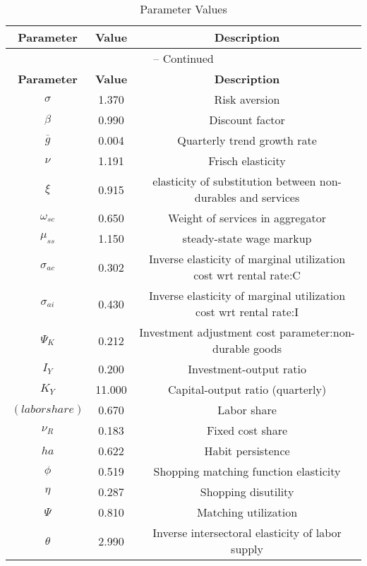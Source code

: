 \begin{center}
\begin{longtable}{ccc}
\caption{Parameter Values}\\%
\toprule%
\multicolumn{1}{c}{\textbf{Parameter}} &
\multicolumn{1}{c}{\textbf{Value}} &
 \multicolumn{1}{c}{\textbf{Description}}\\%
\midrule%
\endfirsthead
\multicolumn{3}{c}{{\tablename} \thetable{} -- Continued}\\%
\midrule%
\multicolumn{1}{c}{\textbf{Parameter}} &
\multicolumn{1}{c}{\textbf{Value}} &
  \multicolumn{1}{c}{\textbf{Description}}\\%
\midrule%
\endhead
${\sigma}$ 	 & 	 1.370 	 & 	 Risk aversion\\
${\beta}$ 	 & 	 0.990 	 & 	 Discount factor\\
${\overline{g}}$ 	 & 	 0.004 	 & 	 Quarterly trend growth rate\\
$\nu$ 	 & 	 1.191 	 & 	 Frisch elasticity\\
$\xi$ 	 & 	 0.915 	 & 	 elasticity of substitution between non-durables and services\\
$\omega_{sc}$ 	 & 	 0.650 	 & 	 Weight of services in aggregator\\
$\mu_{ss}$ 	 & 	 1.150 	 & 	 steady-state wage markup\\
${\sigma_{ac}}$ 	 & 	 0.302 	 & 	 Inverse elasticity of marginal utilization cost wrt rental rate:C\\
${\sigma_{ai}}$ 	 & 	 0.430 	 & 	 Inverse elasticity of marginal utilization cost wrt rental rate:I\\
${\Psi_{K}}$ 	 & 	 0.212 	 & 	 Investment adjustment cost parameter:non-durable goods\\
${I_Y}$ 	 & 	 0.200 	 & 	 Investment-output ratio\\
${K_Y}$ 	 & 	 11.000 	 & 	 Capital-output ratio (quarterly)\\
$(labor share)$ 	 & 	 0.670 	 & 	 Labor share\\
${\nu_R}$ 	 & 	 0.183 	 & 	 Fixed cost share\\
${ha}$ 	 & 	 0.622 	 & 	 Habit persistence\\
${\phi}$ 	 & 	 0.519 	 & 	 Shopping matching function elasticity\\
${\eta}$ 	 & 	 0.287 	 & 	 Shopping disutility\\
${\Psi}$ 	 & 	 0.810 	 & 	 Matching utilization\\
${\theta}$ 	 & 	 2.990 	 & 	 Inverse intersectoral elasticity of labor supply\\

\end{longtable}
\end{center}
